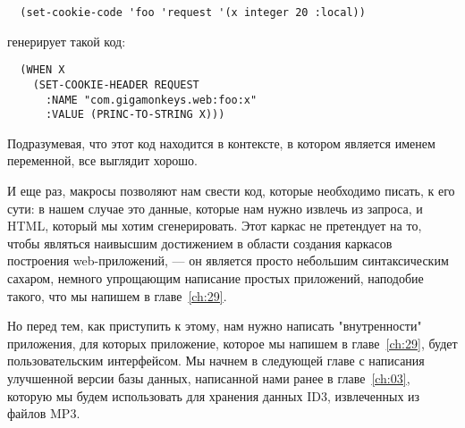 \begin{lstlisting}
  (set-cookie-code 'foo 'request '(x integer 20 :local))
\end{lstlisting}

генерирует такой код:

\begin{lstlisting}
  (WHEN X
    (SET-COOKIE-HEADER REQUEST
      :NAME "com.gigamonkeys.web:foo:x"
      :VALUE (PRINC-TO-STRING X)))
\end{lstlisting}

Подразумевая, что этот код находится в контексте, в котором  является именем
переменной, все выглядит хорошо.

И еще раз, макросы позволяют нам свести код, которые необходимо писать, к его сути: в
нашем случае это данные, которые нам нужно извлечь из запроса, и HTML, который мы хотим
сгенерировать. Этот каркас не претендует на то, чтобы являться наивысшим достижением в
области создания каркасов построения web-приложений, --- он является просто небольшим
синтаксическим сахаром, немного упрощающим написание простых приложений, наподобие такого,
что мы напишем в главе~\ref{ch:29}.

Но перед тем, как приступить к этому, нам нужно написать "внутренности" приложения, для
которых приложение, которое мы напишем в главе~\ref{ch:29}, будет пользовательским
интерфейсом. Мы начнем в следующей главе с написания улучшенной версии базы данных,
написанной нами ранее в главе~\ref{ch:03}, которую мы будем использовать для хранения
данных ID3, извлеченных из файлов MP3.

